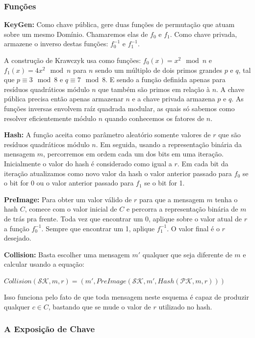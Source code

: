 \documentclass[a4paper]{article}
\begin{document}
\subsubsection{Funções}

\textbf{KeyGen: }Como chave pública, gere duas funções de permutação
que atuam sobre um mesmo Domínio. Chamaremos elas de $f_0$ e
$f_1$. Como chave privada, armazene o inverso destas funções:
$f_0^{-1}$ e $f_1^{-1}$.

A construção de Krawczyk usa como funções: $f_0(x) = x^2 \mod n$ e
$f_1(x) = 4x^2 \mod n$ para $n$ sendo um múltiplo de dois primos
grandes $p$ e $q$, tal que $p \equiv 3 \mod 8$ e $q \equiv 7 \mod
8$. E sendo a função definida apenas para resíduos quadráticos módulo
$n$ que também são primos em relação à $n$. A chave pública precisa
então apenas armazenar $n$ e a chave privada armazena $p$ e $q$. As
funções inversas envolvem raíz quadrada modular, as quais só sabemos
como resolver eficientemente módulo $n$ quando conhecemos os fatores
de $n$.

\textbf{Hash:} A função aceita como parâmetro aleatório somente
valores de $r$ que são resíduos quadráticos módulo $n$. Em seguida,
usando a representação binária da mensagem $m$, percorremos em ordem
cada um dos bits em uma iteração. Inicialmente o valor do hash é
considerado como igual a $r$. Em cada bit da iteração atualizamos como
novo valor da hash o valor anterior passado para $f_0$ se o bit for 0
ou o valor anterior passado para $f_1$ se o bit for 1.

\textbf{PreImage:} Para obter um valor válido de $r$ para que a
mensagem $m$ tenha o hash $C$, comece com o valor inicial de $C$ e
percorra a representação binária de $m$ de trás pra frente. Toda vez
que encontrar um 0, aplique sobre o valor atual de $r$ a função
$f_0^{-1}$. Sempre que encontrar um 1, aplique $f_1^{-1}$. O valor
final é o $r$ desejado.

\textbf{Collision:} Basta escolher uma mensagem $m'$ qualquer que seja
diferente de $m$ e calcular usando a equação:

$Collision(\mathcal{SK}, m, r) = (m', PreImage(\mathcal{SK}, m',
Hash(\mathcal{PK}, m, r)))$

Isso funciona pelo fato de que toda mensagem neste esquema é capaz de
produzir qualquer $c \in C$, bastando que se mude o valor de $r$
utilizado no hash.

\subsubsection{A Exposição de Chave}
\end{document}
